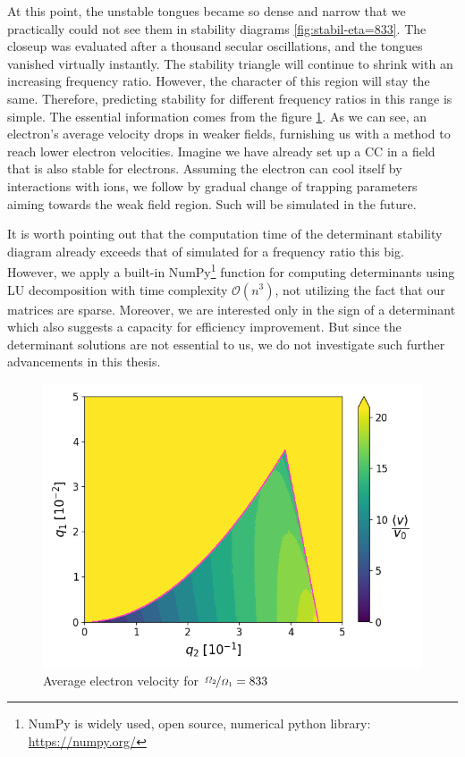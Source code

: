 At this point, the unstable tongues became so dense and narrow that we practically could not see them in stability diagrams \ref{fig:stabil-eta=833}. The closeup was evaluated after a thousand secular oscillations, and the tongues vanished virtually instantly. The stability triangle will continue to shrink with an increasing frequency ratio. However, the character of this region will stay the same. Therefore, predicting stability for different frequency ratios in this range is simple. The essential information comes from the figure \ref{fig:vel-eta=833}. As we can see, an electron's average velocity drops in weaker fields, furnishing us with a method to reach lower electron velocities. Imagine we have already set up a CC in a field that is also stable for electrons. Assuming the electron can cool itself by interactions with ions, we follow by gradual change of trapping parameters aiming towards the weak field region. Such will be simulated in the future.

It is worth pointing out that the computation time of the determinant stability diagram already exceeds that of simulated for a frequency ratio this big. However, we apply a built-in NumPy\footnote{NumPy is widely used, open source, numerical python library: \href{https://numpy.org}{https://numpy.org/}} function for computing determinants using LU decomposition \cite{teukolsky1992numerical} with time complexity $\mathcal{O}(n^3)$, not utilizing the fact that our matrices are sparse. Moreover, we are interested only in the sign of a determinant which also suggests a capacity for efficiency improvement. But since the determinant solutions are not essential to us, we do not investigate such further advancements in this thesis.

\begin{figure}[H]
	\centering
	\includegraphics[width=\linewidth]{img/0_ions_1_electrons_q1_0.0-0.05_q2_0.0-0.5_960x960_833_1000.png}
	\caption{Average electron velocity for $\nicefrac{\Omega_2}{\Omega_1} = 833$}
	\label{fig:vel-eta=833}
\end{figure}


